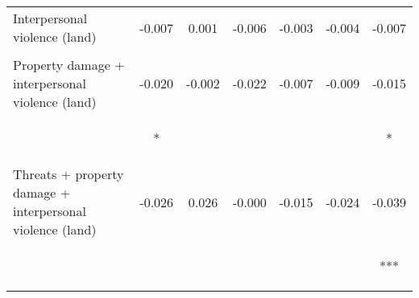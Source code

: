 \begin{tabular}{lcccccc}
\noalign{\smallskip}Interpersonal violence (land) & -0.007 & 0.001 & -0.006 & -0.003 & -0.004 & -0.007\\
 & \begin{footnotesize}[0.008]\end{footnotesize} & \begin{footnotesize}[0.014]\end{footnotesize} & \begin{footnotesize}[0.013]\end{footnotesize} & \begin{footnotesize}[0.004]\end{footnotesize} & \begin{footnotesize}[0.006]\end{footnotesize} & \begin{footnotesize}[0.005]\end{footnotesize}\\
\noalign{\smallskip}Property damage + interpersonal violence (land) & -0.020 & -0.002 & -0.022 & -0.007 & -0.009 & -0.015\\
 & \begin{footnotesize}[0.012]*\end{footnotesize} & \begin{footnotesize}[0.021]\end{footnotesize} & \begin{footnotesize}[0.020]\end{footnotesize} & \begin{footnotesize}[0.007]\end{footnotesize} & \begin{footnotesize}[0.008]\end{footnotesize} & \begin{footnotesize}[0.008]*\end{footnotesize}\\
\noalign{\smallskip}Threats + property damage + interpersonal violence (land) & -0.026 & 0.026 & -0.000 & -0.015 & -0.024 & -0.039\\
 & \begin{footnotesize}[0.022]\end{footnotesize} & \begin{footnotesize}[0.036]\end{footnotesize} & \begin{footnotesize}[0.034]\end{footnotesize} & \begin{footnotesize}[0.011]\end{footnotesize} & \begin{footnotesize}[0.015]\end{footnotesize} & \begin{footnotesize}[0.014]***\end{footnotesize}\\

\end{tabular}
